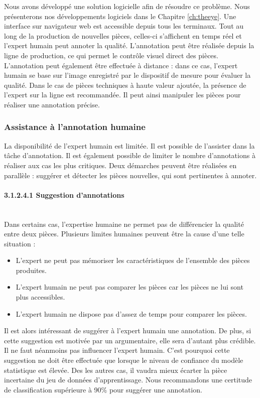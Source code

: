 Nous avons développé une solution logicielle afin de résoudre ce problème.
Nous présenterons nos développements logiciels dans le Chapitre \ref{ch:theeye}.
Une interface sur navigateur web est accessible depuis tous les terminaux.
Tout au long de la production de nouvelles pièces, celles-ci s'affichent en temps réel et l'expert humain peut annoter la qualité.
L'annotation peut être réalisée depuis la ligne de production, ce qui permet le contrôle visuel direct des pièces.
L'annotation peut également être effectuée à distance : dans ce cas, l'expert humain se base sur l'image enregistré par le dispositif de mesure pour évaluer la qualité.
Dans le cas de pièces techniques à haute valeur ajoutée, la présence de l'expert sur la ligne est recommandée.
Il peut ainsi manipuler les pièces pour réaliser une annotation précise.

\subsubsection{Assistance à l'annotation humaine} \label{subsec:labelling_assistance}
La disponibilité de l'expert humain est limitée.
Il est possible de l'assister dans la tâche d'annotation.
Il est également possible de limiter le nombre d'annotations à réaliser aux cas les plus critiques.
Deux démarches peuvent être réalisées en parallèle : suggérer et détecter les pièces nouvelles, qui sont pertinentes à annoter.

\paragraph{3.1.2.4.1 Suggestion d'annotations}\mbox{} \\
Dans certains cas, l'expertise humaine ne permet pas de différencier la qualité entre deux pièces.
Plusieurs limites humaines peuvent être la cause d'une telle situation :
\begin{itemize}
	\item L'expert ne peut pas mémoriser les caractéristiques de l'ensemble des pièces produites.
	\item L'expert humain ne peut pas comparer les pièces car les pièces ne lui sont plus accessibles.
	\item L'expert humain ne dispose pas d'assez de temps pour comparer les pièces.
\end{itemize}

Il est alors intéressant de suggérer à l'expert humain une annotation.
De plus, si cette suggestion est motivée par un argumentaire, elle sera d'autant plus crédible.
Il ne faut néanmoins pas influencer l'expert humain.
C'est pourquoi cette suggestion ne doit être effectuée que lorsque le niveau de confiance du modèle statistique est élevée.
Des les autres cas, il vaudra mieux écarter la pièce incertaine du jeu de données d'apprentissage.
Nous recommandons une certitude de classification supérieure à 90\% pour suggérer une annotation.

